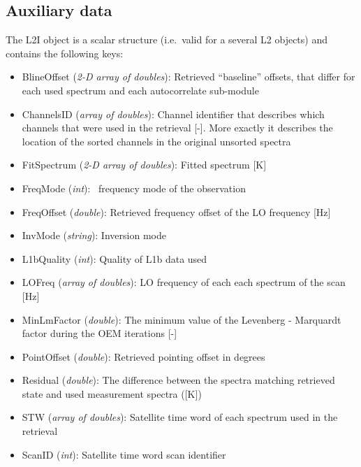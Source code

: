 \subsection{Auxiliary data}

The L2I object is a scalar structure (i.e.\ valid for a several L2 objects)
and contains the following keys:

\begin{itemize}
  \item BlineOffset (\emph{2-D array of doubles}): Retrieved ``baseline''
    offsets, that differ for each used spectrum and each autocorrelate sub-module
  \item ChannelsID (\emph{array of doubles}): Channel identifier that describes
    which channels that were used in the retrieval [-]. More exactly it
    describes the location of the sorted channels in the original unsorted
    spectra
  \item FitSpectrum (\emph{2-D array of doubles}): Fitted spectrum [K]
  \item FreqMode (\emph{int}): \smr\ frequency mode of the observation
  \item FreqOffset (\emph{double}): Retrieved frequency offset of the LO frequency [Hz]
  \item InvMode (\emph{string}): Inversion mode
  \item L1bQuality (\emph{int}): Quality of L1b data used
  \item LOFreq (\emph{array of doubles}): LO frequency of each each spectrum of
    the scan [Hz]
  \item MinLmFactor (\emph{double}): The minimum value of the Levenberg -
    Marquardt factor during the OEM iterations [-]
  \item PointOffset (\emph{double}): Retrieved pointing offset in degrees
  \item Residual (\emph{double}): The difference between the spectra matching
    retrieved state and used measurement spectra ([K]) 
  \item STW (\emph{array of doubles}): Satellite time word of each spectrum
    used in the retrieval
  \item ScanID (\emph{int}): Satellite time word scan identifier
\end{itemize}



